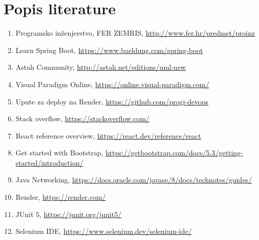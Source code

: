 \chapter*{Popis literature}
	 	
	
		
		
	\begin{enumerate}
		
		
		\item  Programsko inženjerstvo, FER ZEMRIS, \url{http://www.fer.hr/predmet/proinz}
		
		\item  Learn Spring Boot, \url{https://www.baeldung.com/spring-boot}
		
		\item  Astah Community, \url{http://astah.net/editions/uml-new}
		
		\item  Visual Paradigm Online, \url{https://online.visual-paradigm.com/}
		
		\item  Upute za deploy na Render, \url{https://github.com/progi-devops}
		
		\item  Stack overflow, \url{https://stackoverflow.com/}
		
		\item  React reference overview, \url{https://react.dev/reference/react}
		
		\item  Get started with Bootstrap, \url{https://getbootstrap.com/docs/5.3/getting-started/introduction/}
		
		\item  Java Networking, \url{https://docs.oracle.com/javase/8/docs/technotes/guides/}
		
		\item  Render, \url{https://render.com/}
		
		\item  JUnit 5, \url{https://junit.org/junit5/} 
		
		\item Selenium IDE, \url{https://www.selenium.dev/selenium-ide/}
		
	\end{enumerate}
		
		 